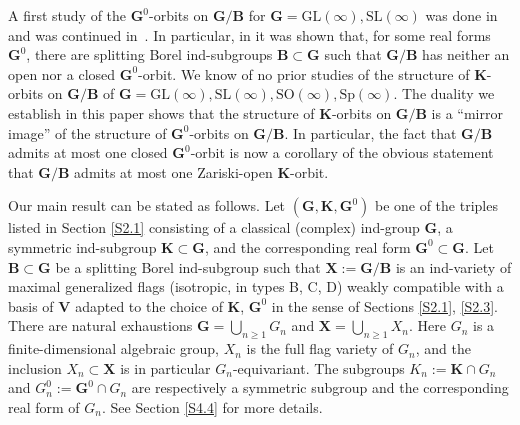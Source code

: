 \documentclass{amsart}
\theoremstyle{definition}
\begin{document}
A first study of the $\mathbf{G}^0$-orbits on $\mathbf{G}/\mathbf{B}$ for $\mathbf{G}=\mathrm{GL}(\infty),\mathrm{SL}(\infty)$ was done in~\cite{Ignatyev-Penkov-Wolf} and was continued in~\cite{W}.  In particular, in \cite{Ignatyev-Penkov-Wolf} it was shown that, for some real forms $\mathbf{G}^0$, there are splitting Borel ind-subgroups $\mathbf{B}\subset \mathbf{G}$ such that $\mathbf{G}/\mathbf{B}$ has neither an open nor a closed $\mathbf{G}^0$-orbit.  %
We know of no prior studies of the structure of $\mathbf{K}$-orbits on $\mathbf{G}/\mathbf{B}$ of $\mathbf{G}=\mathrm{GL}(\infty),\mathrm{SL}(\infty),\mathrm{SO}(\infty),\mathrm{Sp}(\infty)$.  The duality we establish in this paper shows that the structure of $\mathbf{K}$-orbits on $\mathbf{G}/\mathbf{B}$ is a ``mirror image'' of the structure of $\mathbf{G}^0$-orbits on $\mathbf{G}/\mathbf{B}$.  In particular, the fact that $\mathbf{G}/\mathbf{B}$ admits at most one closed $\mathbf{G}^0$-orbit is now a corollary of the obvious statement that $\mathbf{G}/\mathbf{B}$ admits at most one Zariski-open $\mathbf{K}$-orbit.  %


Our main result can be stated as follows.
Let $(\mathbf{G},\mathbf{K},\mathbf{G}^0)$ be one of the triples 
listed in Section \ref{S2.1}
consisting of
a classical (complex) ind-group $\mathbf{G}$, a symmetric ind-subgroup $\mathbf{K}\subset\mathbf{G}$,
and the corresponding real form $\mathbf{G}^0\subset\mathbf{G}$.
Let $\mathbf{B}\subset\mathbf{G}$ be a splitting Borel ind-subgroup
such that $\mathbf{X}:=\mathbf{G}/\mathbf{B}$ is 
an ind-variety of maximal generalized flags (isotropic, in types B, C, D)
weakly compatible with a basis of $\mathbf{V}$ adapted to 
the choice of $\mathbf{K}$, $\mathbf{G}^0$ in the sense of Sections \ref{S2.1}, \ref{S2.3}.
There are natural exhaustions $\mathbf{G}=\bigcup_{n\geq 1}G_n$
and $\mathbf{X}=\bigcup_{n\geq 1}X_n$.
Here $G_n$ is a finite-dimensional algebraic group,
$X_n$ is the full flag variety of $G_n$,
and the inclusion $X_n\subset\mathbf{X}$ is in particular $G_n$-equivariant.
The subgroups $K_n:=\mathbf{K}\cap G_n$ and $G^0_n:=\mathbf{G}^0\cap G_n$
are respectively a symmetric subgroup and the corresponding real form of $G_n$.
See Section \ref{S4.4} for more details.
\end{document}
